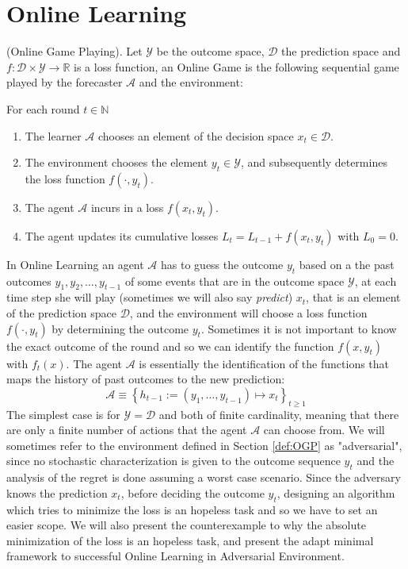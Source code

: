 \section{Online Learning}
\label{sec:OnlineLearning}
\begin{definition}(Online Game Playing).\label{def:OGP}
    Let $\mathcal Y$ be the outcome space, $\mathcal D$ the prediction space and $f:\mathcal D\times\mathcal Y\to \mathbb R$ is a loss function, an Online Game is the following sequential game played by the forecaster $\mathcal A$ and the environment:

    For each round $t\in \mathbb N$
    \begin{enumerate}
        \item The learner $\mathcal A$ chooses an element of the decision space $x_t\in\mathcal D$.
        \item The environment chooses the element $y_t\in\mathcal Y$, and subsequently determines the loss function $f(\cdot,y_t)$.
        \item The agent $\mathcal A$ incurs in a loss $f(x_t,y_t)$.
		\item The agent updates its cumulative losses $L_t=L_{t-1}+f(x_t,y_t)$ with $L_0=0$.
    \end{enumerate}
\end{definition}

In Online Learning an agent $\mathcal A$ has to guess the outcome $y_t$ based on a the past outcomes $y_1,y_2,\ldots,y_{t-1}$ of some events that are in the outcome space $\mathcal Y$, at each time step she will play (sometimes we will also say \emph{predict}) $x_t$, that is an element of the prediction space $\mathcal D$, and the environment will choose a loss function $f(\cdot,y_t)$ by determining the outcome $y_t$.
Sometimes it is not important to know the exact outcome of the round and so we can identify the function $f(x,y_t)$ with $f_t(x)$. The agent $\mathcal A$ is essentially the identification of the functions that maps the history of past outcomes to the new prediction:
$$\mathcal A\equiv\left\{h_{t-1}:=(y_1,\ldots,y_{t-1})\longmapsto x_t\right\}_{t\ge 1} $$
The simplest case is for $\mathcal Y=\mathcal D$ and both of finite cardinality, meaning that there are only a finite number of actions that the agent $\mathcal A$ can choose from. 
We will sometimes refer to the environment defined in Section \ref{def:OGP} as "adversarial", since no stochastic characterization is given to the outcome sequence $y_t$ and the analysis of the regret is done assuming a worst case scenario.
Since the adversary knows the prediction $x_t$, before deciding the outcome $y_t$, designing an algorithm which tries to minimize the loss is an hopeless task and so we have to set an easier scope. We will also present the counterexample to why the absolute minimization of the loss is an hopeless task, and present the adapt minimal framework to successful Online Learning in Adversarial Environment.

